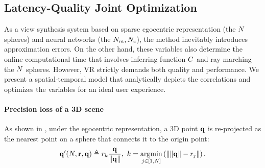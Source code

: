 \subsection{Latency-Quality Joint Optimization}
\label{sec:method:optimization}
As a view synthesis system based on sparse egocentric representation (the $N$ spheres) and neural networks (the $N_{m}, N_{c}$), the method inevitably introduces approximation errors. On the other hand, these variables also determine the online computational time that involves inferring function $C$ and ray marching the $N$ spheres. 
However, VR strictly demands both quality and performance. We present a spatial-temporal model that analytically depicts the correlations and optimizes the variables for an ideal user experience.

\paragraph{Precision loss of a 3D scene}
As shown in , under the egocentric representation, a 3D point $\mathbf{q}$ is re-projected as the nearest point on a sphere that connects it to the origin point:
\begin{equation}\label{eq:closestPoint3D}
{\pt^\prime}(\sphereNum,\mathbf{\sphereRadius},\SpatialPt) \triangleq \sphereRadius_k \frac{\pt}{\norm{\pt}}, \ k=\argmin_{j\in[1,\sphereNum]}\left(\norm{\norm{\SpatialPt}-\sphereRadius_j}\right).
\end{equation}

